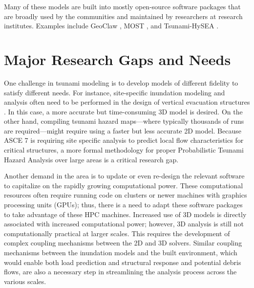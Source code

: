 Many of these models are built into mostly open-source software packages that are broadly used by the communities and maintained by researchers at research institutes. Examples include GeoClaw \citep{berger2011geoclaw}, MOST \citep{titov1997implementation}, and Tsunami-HySEA \citep{macias2016comparison}.

\section{Major Research Gaps and Needs}
\label{sec:tsunami_gaps}

One challenge in tsunami modeling is to develop models of different fidelity to satisfy different needs. For instance, site-specific inundation modeling and analysis often need to be performed in the design of vertical evacuation structures \citep{ash2015structures, gonzalez2013tsunami}. In this case, a more accurate but time-consuming 3D model is desired. On the other hand, compiling tsunami hazard maps—where typically thousands of runs are required—might require using a faster but less accurate 2D model.  Because ASCE 7 is requiring site specific analysis to predict local flow characteristics for critical structures, a more formal methodology for proper Probabilistic Tsunami Hazard Analysis over large areas is a critical research gap.

Another demand in the area is to update or even re-design the relevant software to capitalize on the rapidly growing computational power. These computational resources often require running code on clusters or newer machines with graphics processing units (GPUs); thus, there is a need to adapt these software packages to take advantage of these HPC machines.  Increased use of 3D models is directly associated with increased computational power; however, 3D analysis is still not computationally practical at larger scales.  This requires the development of complex coupling mechanisms between the 2D and 3D solvers.  Similar coupling mechanisms between the inundation models and the built environment, which would enable both load prediction and structural response and potential debris flows, are also a necessary step in streamlining the analysis process across the various scales.  

%
